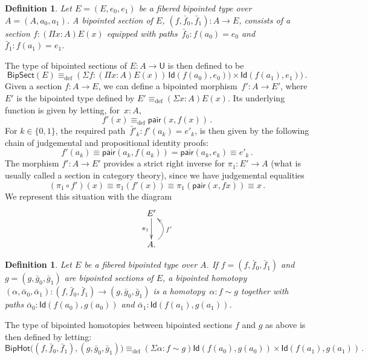 \documentclass[reqno,10pt,a4paper,oneside]{amsart}
\numberwithin{equation}{section}
\theoremstyle{mythm}
\theoremstyle{mydef}
\newtheorem{definition}[theorem]{Definition}
\theoremstyle{myrmk}
\newcommand{\ie}{\text{i.e.\ }}
\newcommand{\deq}{\equiv}
\newcommand{\defeq}{\deq_{\mathrm{def}}}
\newcommand{\co}{\colon}
\newcommand{\pair}{\mathsf{pair}}
\newcommand{\Id}{\mathsf{Id}}
\newcommand{\UU}{\mathsf{U}}
\newcommand{\BipSect}{\mathsf{BipSect}}
\newcommand{\BipHot}{\mathsf{BipHot}}
\begin{document}
\begin{definition} \label{def:fibsection} Let $E = (E, e_0, e_1)$ be a fibered bipointed type over
$A = (A, a_0, a_1)$.  A \emph{bipointed section} of $E$, $(f, \bar{f}_0, \bar{f}_1) \co A \to E$, 
consists of a section $f \co (\Pi x \co A) E(x)$ equipped with paths~$\bar{f}_0 \co f(a_0) = e_0$ 
and $\bar{f}_1 \co f(a_1) = e_1$. \end{definition} 


The type of bipointed sections of $E \co A \to \UU$ is then defined to be
\[
\BipSect(E) \defeq (\Sigma f \co (\Pi x : A) E(x)) \, \Id( f(a_0), e_0)) \times \Id ( f(a_1), e_1)) \, .
\]
Given a section $f \co A \to E$, we can define a bipointed morphism~$f'  \co A \to E'$, where $E'$ is the
bipointed type defined by $E' \defeq (\Sigma x :A) E(x)$. Its underlying function is given by letting,  for~$x : A$, 
\[
f'(x) \defeq \pair(x, f(x)) \, .
\]
For $k \in \{ 0, 1 \}$, the required path~$\bar{f}'_k \co f'(a_k) = e'_k$,
is then given by the following chain of judgemental and propositional identity proofs:
\[
f'(a_k) \deq \pair(a_k, f(a_k)) =  \pair(a_k, e_k) \deq e'_k \, .
\]
The morphism $f' \co A \to E'$ provides a strict right inverse for $\pi_1 \co E' \to A$ (\ie what is usually called a section in 
category theory), since we have judgemental equalities
\[
 (\pi_1 \circ f')(x) \deq \pi_1 (f'(x)) \deq \pi_1 (\pair(x, f x)) \deq x \, .
\]
 We represent this situation with the diagram
\[
\xymatrix{
E' \ar[d]_{\pi_1} \\
A . \ar@/_1.2pc/[u]_{f'} }
\]



\begin{definition} \label{def:2cellsection} Let $E$ be a fibered bipointed type over $A$. If $f = (f, \bar{f}_0,\bar{f}_1)$ and $g = (g, \bar{g}_0, \bar{g}_1)$ are bipointed sections of $E$, a \emph{bipointed homotopy} 
$(\alpha, \bar{\alpha}_0, \bar{\alpha}_1) \co (f, \bar{f}_0, \bar{f}_1)  \rightarrow (g, \bar{g}_0, \bar{g}_1)$ 
is a homotopy~$\alpha \co f \sim g$ together with paths $\bar{\alpha}_0 \co \Id( f(a_0),  g(a_0))$ and $\bar{\alpha}_1 \co \Id ( f(a_1) , g(a_1))$. 
\end{definition} 

The type of bipointed homotopies between bipointed sections $f$ and $g$ as above is then defined by letting:
\[
\BipHot \big( (f, \bar{f}_0, \bar{f}_1), (g, \bar{g}_0, \bar{g}_1) \big) \defeq
(\Sigma \alpha \co f \sim g) \Id ( f(a_0), g(a_0) ) \times \Id ( f(a_1) , g(a_1) ) \, .
\]
\end{document}
